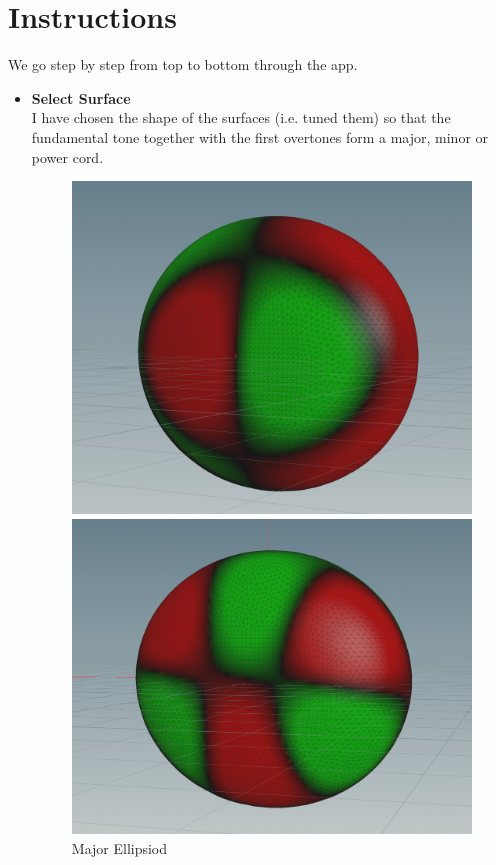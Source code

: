 \documentclass[12pt]{scrartcl}%
\begin{document}
\section*{Instructions}
We go step by step from top to bottom through the app.
\begin{itemize}
\item \textbf{Select Surface}\\
I have chosen the shape of the surfaces (i.e. tuned them) so that the fundamental tone together with the first overtones form a major, minor or power cord.
\begin{figure}[!htb]
  \includegraphics[width=\linewidth]{major}
  \caption{Major Ellipsiod}
\endminipage\hfill
{}
  \includegraphics[width=\linewidth]{minor}

\end{figure}
\end{itemize}
\end{document}
